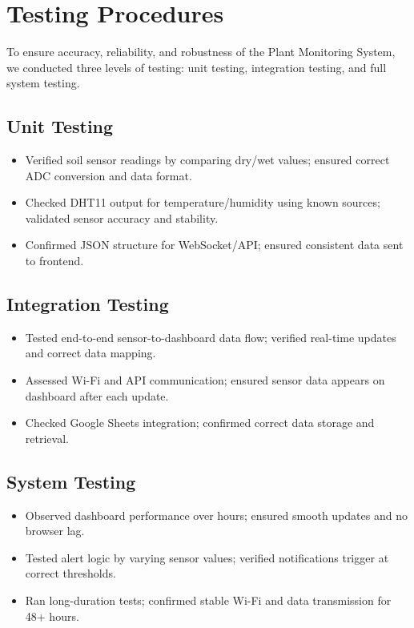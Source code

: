 \documentclass[12pt,a4paper]{article}
\begin{document}
\section{Testing Procedures}

To ensure accuracy, reliability, and robustness of the Plant Monitoring System, we conducted three levels of testing: unit testing, integration testing, and full system testing.

\subsection{Unit Testing}
\begin{itemize}[leftmargin=*]
    \item Verified soil sensor readings by comparing dry/wet values; ensured correct ADC conversion and data format.
    \item Checked DHT11 output for temperature/humidity using known sources; validated sensor accuracy and stability.
    \item Confirmed JSON structure for WebSocket/API; ensured consistent data sent to frontend.
\end{itemize}

\subsection{Integration Testing}
\begin{itemize}[leftmargin=*]
    \item Tested end-to-end sensor-to-dashboard data flow; verified real-time updates and correct data mapping.
    \item Assessed Wi-Fi and API communication; ensured sensor data appears on dashboard after each update.
    \item Checked Google Sheets integration; confirmed correct data storage and retrieval.
\end{itemize}

\subsection{System Testing}
\begin{itemize}[leftmargin=*]
    \item Observed dashboard performance over hours; ensured smooth updates and no browser lag.
    \item Tested alert logic by varying sensor values; verified notifications trigger at correct thresholds.
    \item Ran long-duration tests; confirmed stable Wi-Fi and data transmission for 48+ hours.
\end{itemize}
\end{document}
